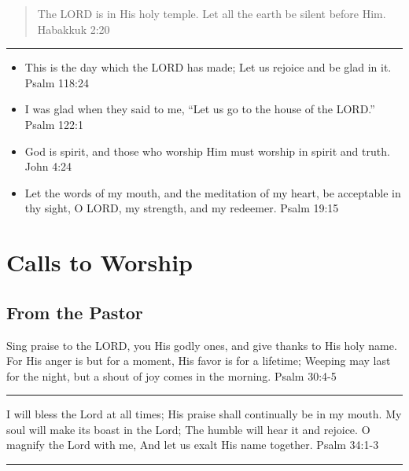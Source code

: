 \documentclass[]{book}
\begin{document}
\begin{quote}
The LORD is in His holy temple. Let all the earth be silent before Him.
\textbar{} Habakkuk 2:20
\end{quote}

\begin{center}\rule{0.5\linewidth}{\linethickness}\end{center}

\begin{itemize}
\item
  This is the day which the LORD has made; Let us rejoice and be glad in
  it. \textbar{} Psalm 118:24
\item
  I was glad when they said to me, ``Let us go to the house of the
  LORD.'' \textbar{} Psalm 122:1
\item
  God is spirit, and those who worship Him must worship in spirit and
  truth. \textbar{} John 4:24
\item
  Let the words of my mouth, and the meditation of my heart, be
  acceptable in thy sight, O LORD, my strength, and my redeemer.
  \textbar{} Psalm 19:15
\end{itemize}

\chapter{Calls to Worship}\label{calls-to-worship}

\section*{From the Pastor}\label{from-the-pastor}

Sing praise to the LORD, you His godly ones, and give thanks to His holy
name. For His anger is but for a moment, His favor is for a lifetime;
Weeping may last for the night, but a shout of joy comes in the morning.
\textbar{} Psalm 30:4-5

\begin{center}\rule{0.5\linewidth}{\linethickness}\end{center}

I will bless the Lord at all times; His praise shall continually be in
my mouth. My soul will make its boast in the Lord; The humble will hear
it and rejoice. O magnify the Lord with me, And let us exalt His name
together. \textbar{} Psalm 34:1-3

\begin{center}\rule{0.5\linewidth}{\linethickness}\end{center}
\end{document}
